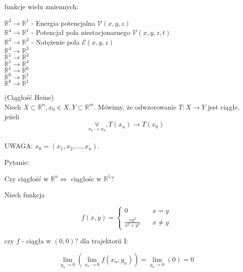 \documentclass[../main.tex]{subfiles}
\begin{document}
\begin{przyklad}
    funkcje wielu zmiennych:
\end{przyklad}


\noindent
$\mathbb{R}^{3}\rightarrow\mathbb{R}^{1}$ - Energia potencjalna $\mathcal{V}(x,y,z)$\\
$\mathbb{R}^{4}\rightarrow\mathbb{R}^{1}$ - Potencjał pola niestacjonarnego $\mathcal{V}(x,y,z,t)$\\
$\mathbb{R}^{3}\rightarrow\mathbb{R}^{3}$ - Natężenie pola $\mathcal{E}(x,y,z)$\\
$\mathbb{R}^{4}\rightarrow\mathbb{R}^{3}$\\
$\mathbb{R}^{1}\rightarrow\mathbb{R}^{3}$\\
$\mathbb{R}^{1}\rightarrow\mathbb{R}^{4}$\\
$\mathbb{R}^{1}\rightarrow\mathbb{R}^{6}$\\
$\mathbb{R}^{6}\rightarrow\mathbb{R}^{1}$\\
$\mathbb{R}^{8}\rightarrow\mathbb{R}^{1}$\\

\begin{definicja}
    (Ciągłość Heine)\\
Niech $X\subset\mathbb{R}^n, x_{0} \in X, Y\subset\mathbb{R}^m$. Mówimy, że odwzorowanie $T: X\rightarrow Y$ jest ciągłe, jeżeli $$\underset{x_n \to x_0}{\forall}, T(x_{n})\rightarrow T(x_{0})$$\\
UWAGA: $x_{0} = (x_{1}, x_{2}, ..., x_{n})$.
\end{definicja}

\vspace{1cm}
\begin{large}
    Pytanie:
\end{large}
Czy ciągłość w $\mathbb{R}^{n} \iff$ ciągłośc w $\mathbb{R}^{1}$?

\begin{przyklad}
    Niech funkcja
\end{przyklad}

\[ f(x,y) =
\begin{cases}
    0                           & \quad x=y\\
    \frac{xy^2}{x^2+y^4}  & \quad x\neq y
\end{cases}
\]

czy $f$ - ciągła w $(0,0)$?
dla trajektorii I:

$$\lim\limits_{y_{n}\to 0}(\lim\limits_{x_{n}\rightarrow 0} f(x_{n},y_{n})) = \lim\limits_{y_{n}\rightarrow 0}(0) = 0$$
\end{document}
